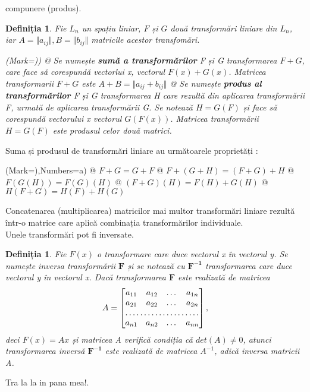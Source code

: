 compunere (produs).
\newtheorem{th_lin_tr_operations}[theorem_liniar_space]{Definiția}
\begin{th_lin_tr_operations}
Fie $\mathit{L_{n}}$ un spațiu liniar, $\mathit{F}$ și $\mathit{G}$ două
transformări liniare din $\mathit{L_{n}}$, iar $A = \Vert a_{ij} \Vert, B =
\Vert b_{ij} \Vert$ matricile acestor transfomări.
\begin{easylist}
\NewList(Mark={)})
@ Se numește \textbf{sumă a transformărilor} F și G transformarea $F + G$, care
face să corespundă vectorlui x, vectorul $F(x) + G(x)$. Matricea transformarii $F + G$
este $A + B = \Vert a_{ij} + b_{ij} \Vert$ 
@ Se numește \textbf{produs al transformărilor} F și G transformarea H care
rezultă din aplicarea transformării F, urmată de aplicarea transformării G. Se
notează $H = G(F)$ și face să corespundă vectorului x vectorul $G(F(x))$.
Matricea transformării $H = G(F)$ este produsul celor două matrici.
\end{easylist}
\end{th_lin_tr_operations}
Suma și produsul de transformări liniare au următoarele proprietăți :
\begin{easylist}
\NewList(Mark={)},Numbers=a)
@ $F + G = G + F$
@ $F + (G + H) = (F + G) + H$
@ $F(G(H)) = F(G)(H)$
@ $(F + G)(H) = F(H) + G(H)$
@ $H(F + G) = H(F) + H(G)$
\end{easylist}
Concatenarea (multiplicarea) matricilor mai multor transformări liniare rezultă
într-o matrice care aplică combinația transformărilor individuale.
\noindent
\\
Unele transformări pot fi inversate.

\newtheorem{th_tr_inverse}[theorem_liniar_space]{Definiția}
\begin{th_tr_inverse}
Fie $F(x)$ o transformare care duce vectorul \textit{x} în vectorul \textit{y}.
Se numește inversa transformării $\mathbf{F}$ și se notează cu $\mathbf{F^{-1}}$
transformarea care duce vectorul \textit{y} în vectorul \textit{x}.
Dacă transformarea $\mathbf{F}$ este realizată de matricea
\[
A = 
\begin{bmatrix}
a_{11} & a_{12} & \dots & a_{1n} \\
a_{21} & a_{22} & \dots & a_{2n} \\
\hdotsfor{4} \\
a_{n1} & a_{n2} & \dots & a_{nn}
\end{bmatrix},
\] deci $F(x) = Ax$ și matricea A verifică condiția că $det(A) \neq 0$, atunci
transformarea inversă $\mathbf{F^{-1}}$ este realizată de matricea $A^{-1}$,
adică inversa matricii A.
\end{th_tr_inverse}

Tra la la in pana mea!.

